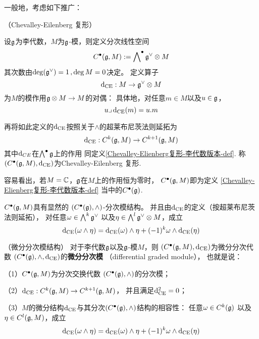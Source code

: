 一般地，考虑如下推广：

\begin{definition}（Chevalley-Eilenberg 复形）

设$\mathfrak{g}$为李代数，$M$为$\mathfrak{g}$-模，则定义分次线性空间
$$C^{\bullet}(\mathfrak{g},M):=\bigwedge\nolimits^{\bullet}\mathfrak{g}^\vee\otimes M$$
其次数由$\deg(\mathfrak{g}^\vee)=1\,,\deg M=0$决定。
定义算子
$$\mathrm{d}_{\operatorname{CE}}: M\to \mathfrak{g}^\vee\otimes M$$
为$M$的模作用$\mathfrak{g}\otimes M\to M$的对偶：
具体地，对任意$m\in M$以及$u\in\mathfrak{g}$，
$$u\lrcorner\,\mathrm{d}_{\operatorname{CE}}(m)=u.m$$

再将如此定义的$\mathrm{d}_{\operatorname{CE}}$按照关于$\wedge$的超莱布尼茨法则延拓为
$$\mathrm{d}_{\operatorname{CE}}:C^k(\mathfrak{g},M)\to C^{k+1}(\mathfrak{g},M)$$
其中$\mathrm{d}_{CE}$在$\bigwedge\nolimits^{\bullet}\mathfrak{g}$上的作用
同定义\ref{Chevalley-Elienberg复形-李代数版本-def}.
称$(C^{\bullet}(\mathfrak{g},M),\mathrm{d}_{\operatorname{CE}})$为Chevalley-Eilenberg 复形.
\end{definition}

容易看出，若$M=\mathbb{C}$，$\mathfrak{g}$在$M$上的作用恒为零时，
$C^{\bullet}(\mathfrak{g},M)$即为定义
\ref{Chevalley-Elienberg复形-李代数版本-def}
当中的$C^{\bullet}(\mathfrak{g})$.

$C^{\bullet}(\mathfrak{g},M)$具有显然的
$(C^{\bullet}(\mathfrak{g}),\wedge)$-分次模结构。
并且由$\mathrm{d}_{\operatorname{CE}}$的定义（按超莱布尼茨法则延拓），
对任意$\omega\in\bigwedge\nolimits^{k}\mathfrak{g}^\vee$
以及$\eta\in\bigwedge\nolimits^{l}\mathfrak{g}^\vee\otimes M$，成立
$$
  \mathrm{d}_{\operatorname{CE}}(\omega\wedge\eta)
= \mathrm{d}_{\operatorname{CE}}(\omega)\wedge\eta
 +(-1)^{k}\omega\wedge\mathrm{d}_{\operatorname{CE}}(\eta)
$$


\begin{prop}（微分分次模结构）
对于李代数$\mathfrak{g}$以及$\mathfrak{g}$-模$M$，则
$(C^{\bullet}(\mathfrak{g},M),\mathrm{d}_{\operatorname{CE}})$为微分分次代数
$(C^{\bullet}(\mathfrak{g}),\wedge,\mathrm{d}_{\operatorname{CE}})$的\textbf{微分分次模}
（differential graded module），
也就是说：\vs

（1）$C^{\bullet}(\mathfrak{g},M)$为分次交换代数
$(C^{\bullet}(\mathfrak{g}),\wedge)$的分次模；\vs

（2）$\mathrm{d}_{\operatorname{CE}}:C^k(\mathfrak{g},M)\to C^{k+1}(\mathfrak{g},M)$，
并且满足$\mathrm{d}_{\operatorname{CE}}^2=0$；\vs

（3）$M$的微分结构$\mathrm{d}_{\operatorname{CE}}$与其分次$(C^{\bullet}(\mathfrak{g}),\wedge)$结构的相容性：
任意$\omega\in C^k(\mathfrak{g})$
以及$\eta\in C^l(\mathfrak{g},M)$，成立
$$
  \mathrm{d}_{\operatorname{CE}}(\omega\wedge\eta)
= \mathrm{d}_{\operatorname{CE}}(\omega)\wedge\eta
 +(-1)^{k}\omega\wedge\mathrm{d}_{\operatorname{CE}}(\eta)
$$
\end{prop}

